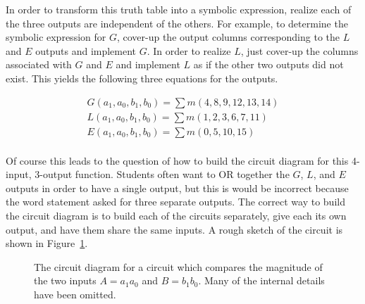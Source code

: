 In order to transform this truth table into a symbolic expression, 
realize each of the three outputs are independent of the
others.  For example, to determine the symbolic expression for $G$,
cover-up the output columns corresponding to the $L$ and $E$ outputs
and implement $G$.  In order to realize $L$, just cover-up the 
columns associated with $G$ and $E$ and implement $L$ as if
the other two outputs did not exist.  This yields the following
three equations for the outputs.

$$\begin{array}{l}
G(a_1,a_0,b_1,b_0)=\sum m(4,8,9,12,13,14)	\\
L(a_1,a_0,b_1,b_0)=\sum m(1,2,3,6,7,11)	\\
E(a_1,a_0,b_1,b_0)=\sum m(0,5,10,15)	\\
\end{array}$$

Of course this leads to the question of how to build the circuit
diagram for this 4-input, 3-output function.  Students often
want to OR together the $G$, $L$, and $E$ outputs in order to have
a single output, but this is would be incorrect because the word 
statement asked for three separate outputs.  The correct way to build
the circuit diagram is to build each of the circuits separately, give
each its own output, and have them share the same inputs.  A rough
sketch of the circuit is shown in Figure~\ref{fig:ThreeOutputs}.

\begin{figure}[ht]
\caption{The circuit diagram for a circuit which compares the 
magnitude of the two inputs $A=a_1 a_0$ and $B=b_1 b_0$.  Many of 
the internal details have been omitted.}
\label{fig:ThreeOutputs}
\end{figure}

